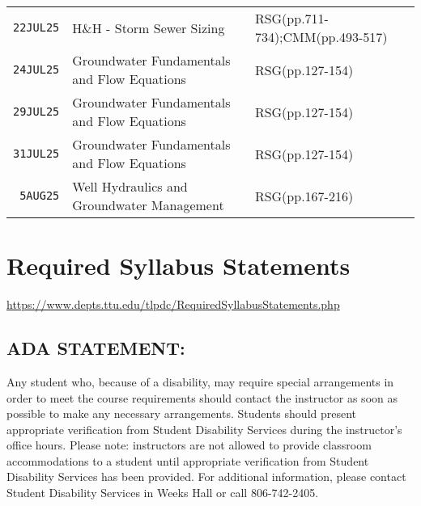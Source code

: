 \documentclass[12pt]{article}
\begin{document}
\begin{table}[ht!]
\begin{tabular}{p{0.5in}p{3.0in}p{3.0in}}
\texttt{22JUL25} & H\&H - Storm Sewer Sizing &RSG(pp.711-734);CMM(pp.493-517)  \\ %
\texttt{24JUL25} & Groundwater Fundamentals and Flow Equations & RSG(pp.127-154)\\ %
\texttt{29JUL25} & Groundwater Fundamentals and Flow Equations & RSG(pp.127-154)\\ %
\texttt{31JUL25} & Groundwater Fundamentals and Flow Equations & RSG(pp.127-154)  \\ %
\texttt{~5AUG25} & Well Hydraulics and Groundwater Management &  RSG(pp.167-216) \\  %
\hline
   \end{tabular}
   \label{tab:schedule}
\end{table}


\clearpage
\clearpage
%

\section*{Required Syllabus Statements}
\url{https://www.depts.ttu.edu/tlpdc/RequiredSyllabusStatements.php}
\subsection*{ADA STATEMENT:}
Any student who, because of a disability, may require special arrangements in order to meet the course requirements should contact the instructor as soon as possible to make any necessary arrangements. Students should present appropriate verification from Student Disability Services during the instructor's office hours. Please note: instructors are not allowed to provide classroom accommodations to a student until appropriate verification from Student Disability Services has been provided. For additional information, please contact Student Disability Services in Weeks Hall or call 806-742-2405.
\end{document}
